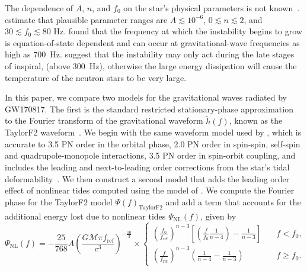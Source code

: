 The dependence of $A$, $n$, and $f_0$ on the star's physical parameters is not known~\citep{Weinberg:2015pxa}. \cite{Essick:2016tkn} estimate that plausible parameter ranges are $A \lesssim 10^{-6}$, $0 \lesssim n \lesssim 2$, and $30 \lesssim f_0 \lesssim 80$ Hz. \cite{Zhou:2018tvc} found that the frequency at which the instability begins to grow is equation-of-state dependent and can occur at gravitational-wave frequencies as high as $700$~Hz. \cite{Andersson:2017iav} suggest that the instability may only act during the late stages of inspiral, (above $300$~Hz), otherwise the large energy dissipation will cause the temperature of the neutron stars to be very large. 

In this paper, we compare two models for the gravitational waves radiated by GW170817. The first is the standard restricted stationary-phase approximation to the Fourier transform of the gravitational waveform $\tilde{h}(f)$, known as the TaylorF2 waveform~\citep{Sathyaprakash:1991mt}. We begin with the same waveform model used by \cite{de2018tidal}, which is accurate to 3.5 PN order in the orbital phase, 2.0 PN order in spin-spin, self-spin and quadrupole-monopole interactions, 3.5 PN order in spin-orbit coupling, and includes the leading and next-to-leading order corrections from the star's tidal deformability~\citep{Kidder:1992fr,Blanchet:1995ez,Blanchet:2004ek,Buonanno:2009zt,Arun:2008kb,Marsat:2013caa,Bohe:2013cla,Bohe:2015ana,Mikoczi:2005dn, Flanagan:2007ix,Vines:2011ud}. We then construct a second model that adds the leading order effect of nonlinear tides computed using the model of \cite{Essick:2016tkn}. We compute the Fourier phase for the TaylorF2 model $\Psi(f)_\mathrm{TaylorF2}$ and add a term that accounts for the additional energy lost due to nonlinear tides $\Psi_\mathrm{NL}(f)$, given by
\begin{equation}
\Psi_\mathrm{NL}(f) = - \frac{25}{768} A \left(\frac{G \mathcal{M} \pi f_\mathrm{ref}}{c^3} \right)^{-\frac{10}{3}} \times \left \{
                     \begin{array}{ll}
                       \left( \frac{f_0}{f_\mathrm{ref}} \right)^{n-3} \left[ \left( \frac{f}{f_0}\frac{1}{n-4} \right) - \frac{1}{n-3} \right] &\quad f < f_0, \\
                       \left( \frac{f}{f_\mathrm{ref}} \right)^{n-3} \left(\frac{1}{n-4} - \frac{1}{n-3} \right)  &\quad f \ge f_0.
                     \end{array}
                     \right.
\label{eqn:fourier_phase_eq1}
\end{equation}
